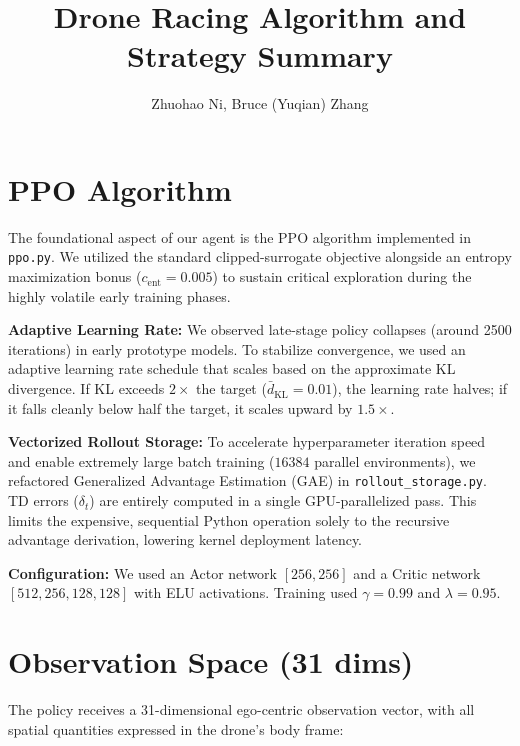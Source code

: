 \documentclass[10pt, twocolumn]{article}
\title{\textbf{Drone Racing Algorithm and Strategy Summary}}
\author{Zhuohao Ni, Bruce (Yuqian) Zhang}
\date{}
\begin{document}
\maketitle

\section{PPO Algorithm}

The foundational aspect of our agent is the PPO algorithm implemented in \texttt{ppo.py}. We utilized the standard clipped-surrogate objective alongside an entropy maximization bonus ($c_\text{ent}=0.005$) to sustain critical exploration during the highly volatile early training phases.

\textbf{Adaptive Learning Rate:} We observed late-stage policy collapses (around 2500 iterations) in early prototype models. To stabilize convergence, we used an adaptive learning rate schedule that scales based on the approximate KL divergence. If KL exceeds $2\times$ the target ($\bar{d}_\text{KL}=0.01$), the learning rate halves; if it falls cleanly below half the target, it scales upward by $1.5\times$.

\textbf{Vectorized Rollout Storage:} To accelerate hyperparameter iteration speed and enable extremely large batch training ($16384$ parallel environments), we refactored Generalized Advantage Estimation (GAE) in \texttt{rollout\_storage.py}. TD errors ($\delta_t$) are entirely computed in a single GPU-parallelized pass. This limits the expensive, sequential Python operation solely to the recursive advantage derivation, lowering kernel deployment latency.

\textbf{Configuration:} We used an Actor network $[256, 256]$ and a Critic network $[512, 256, 128, 128]$ with ELU activations. Training used $\gamma=0.99$ and $\lambda=0.95$.


\section{Observation Space (31 dims)}

The policy receives a 31-dimensional ego-centric observation vector, with all spatial quantities expressed in the drone's body frame:
\end{document}
